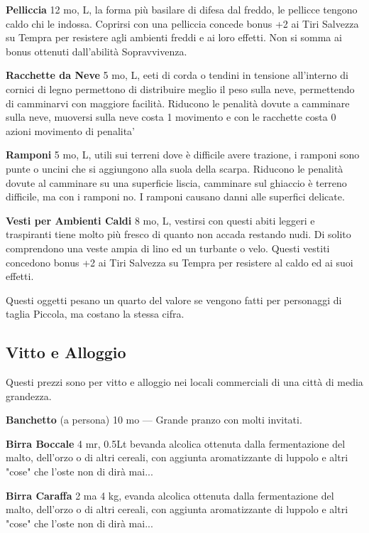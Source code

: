 \documentclass[a4paper,11pt,twoside,openany]{book}
\begin{document}
\textbf{Pelliccia} 12 mo, L, la forma più basilare di difesa dal freddo, le pellicce tengono caldo chi le indossa. Coprirsi con una pelliccia concede bonus +2 ai Tiri Salvezza su Tempra per resistere agli ambienti freddi e ai loro effetti. Non si somma ai bonus ottenuti dall'abilità Sopravvivenza.

\textbf{Racchette da Neve} 5 mo, L, eeti di corda o tendini in tensione all'interno di cornici di legno permettono di distribuire meglio il peso sulla neve, permettendo di camminarvi con maggiore facilità. Riducono le penalità dovute a camminare sulla neve, muoversi sulla neve costa 1 movimento e con le racchette costa 0 azioni movimento di penalita'

\textbf{Ramponi} 5 mo, L, utili sui terreni dove è difficile avere trazione, i ramponi sono punte o uncini che si aggiungono alla suola della scarpa. Riducono le penalità dovute al camminare su una superficie liscia, camminare sul ghiaccio è terreno difficile, ma con i ramponi no. I ramponi causano danni alle superfici delicate.

\textbf{Vesti per Ambienti Caldi} 8 mo, L, vestirsi con questi abiti leggeri e traspiranti tiene molto più fresco di quanto non accada restando nudi. Di solito comprendono una veste ampia di lino ed un turbante o velo. Questi vestiti concedono bonus +2 ai Tiri Salvezza su Tempra per resistere al caldo ed ai suoi effetti.

Questi oggetti pesano un quarto del valore se vengono fatti per personaggi di taglia Piccola, ma costano la stessa cifra.

\pagebreak

\subsection{Vitto e Alloggio}

\label{vitto-e-alloggio}

Questi prezzi sono per vitto e alloggio nei locali commerciali di una città di media grandezza.

\textbf{Banchetto} (a persona) 10 mo --- Grande pranzo con molti invitati.

\textbf{Birra Boccale} 4 mr, 0.5Lt bevanda alcolica ottenuta dalla fermentazione del malto, dell'orzo o di altri cereali, con aggiunta aromatizzante di luppolo e altri "cose" che l'oste non di dirà mai...

\textbf{Birra Caraffa} 2 ma 4 kg, evanda alcolica ottenuta dalla fermentazione del malto, dell'orzo o di altri cereali, con aggiunta aromatizzante di luppolo e altri "cose" che l'oste non di dirà mai...
\end{document}
